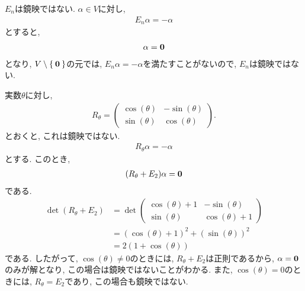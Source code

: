 \begin{example}
  $E_n$は鏡映ではない.
  $\alpha\in V$に対し,
  \begin{align*}
    E_n\alpha=-\alpha
  \end{align*}
  とすると,
  \begin{align*}
    \alpha=\boldsymbol{0}
  \end{align*}
  となり, $V\setminus\Set{\boldsymbol{0}}$の元では,
  $E_n\alpha=-\alpha$を満たすことがないので,
  $E_n$は鏡映ではない.
\end{example}

\begin{example}
 \label{ex:i2m:rot}
 実数$\theta$に対し,
  \begin{align*}
    R_\theta=
    \begin{pmatrix}
      \cos(\theta) & -\sin(\theta) \\
      \sin(\theta) & \cos(\theta)
    \end{pmatrix}.
  \end{align*}
 とおくと, これは鏡映ではない.
 \begin{align*}
    R_\theta \alpha = -\alpha
 \end{align*}
 とする. このとき,
 \begin{align*}
    (R_\theta + E_2)\alpha = \boldsymbol{0}
 \end{align*}
 である.
 \begin{align*}
   \det(R_\theta + E_2) &= 
    \det \begin{pmatrix}
      \cos(\theta) +1 & -\sin(\theta) \\
      \sin(\theta) & \cos(\theta) +1 
    \end{pmatrix}\\
    &=(\cos(\theta) +1)^2 + (\sin(\theta))^2\\
    &=2(1+\cos(\theta))
 \end{align*}
 である.
 したがって, $\cos(\theta)\neq 0$のときには,
 $R_\theta + E_2$は正則であるから, $\alpha=\boldsymbol{0}$のみが解となり,
 この場合は鏡映ではないことがわかる.
 また,  $\cos(\theta)= 0$のときには, $R_\theta=E_2$であり,
 この場合も鏡映ではない.
\end{example}

